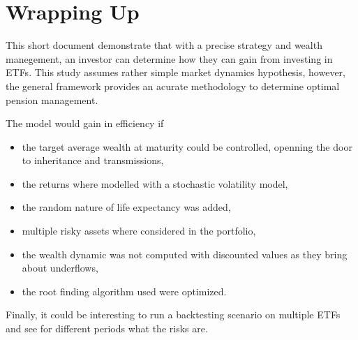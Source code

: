 \documentclass{article}
\begin{document}
\section{Wrapping Up}

This short document demonstrate that with a precise strategy and wealth manegement, an investor can determine how they can gain from investing in ETFs. This study assumes rather simple market dynamics hypothesis, however, the general framework provides an acurate methodology to determine optimal pension management.

The model would gain in efficiency if
\begin{itemize}
\item the target average wealth at maturity could be controlled, openning the door to inheritance and transmissions,
\item the returns where modelled with a stochastic volatility model,
\item the random nature of life expectancy was added,
\item multiple risky assets where considered in the portfolio,
\item the wealth dynamic was not computed with discounted values as they bring about underflows,
\item the root finding algorithm used were optimized.
\end{itemize}


Finally, it could be interesting to run a backtesting scenario on multiple ETFs and see for different periods what the risks are.
\end{document}
